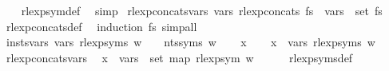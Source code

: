 \begin{isabellebody}
%
\isadelimproof
\ \ %
\endisadelimproof
%
\isatagproof
{}\isamarkupfalse%
\ rlexp{\isacharunderscore}{\kern0pt}sym{\isacharunderscore}{\kern0pt}def\ \isamarkupfalse%
\ simp%
\endisatagproof
{\isafoldproof}%
%
\isadelimproof
\isanewline
%
\endisadelimproof
\isanewline
{}\isamarkupfalse%
\ rlexp{\isacharunderscore}{\kern0pt}concats{\isacharunderscore}{\kern0pt}vars{\isacharcolon}{\kern0pt}\ {\isachardoublequoteopen}vars\ {\isacharparenleft}{\kern0pt}rlexp{\isacharunderscore}{\kern0pt}concats\ fs{\isacharparenright}{\kern0pt}\ {\isacharequal}{\kern0pt}\ {\isasymUnion}{\isacharparenleft}{\kern0pt}vars\ {\isacharbackquote}{\kern0pt}\ set\ fs{\isacharparenright}{\kern0pt}{\isachardoublequoteclose}\isanewline
%
\isadelimproof
\ \ %
\endisadelimproof
%
\isatagproof
{}\isamarkupfalse%
\ rlexp{\isacharunderscore}{\kern0pt}concats{\isacharunderscore}{\kern0pt}def\ \isamarkupfalse%
\ {\isacharparenleft}{\kern0pt}induction\ fs{\isacharparenright}{\kern0pt}\ simp{\isacharunderscore}{\kern0pt}all%
\endisatagproof
{\isafoldproof}%
%
\isadelimproof
\isanewline
%
\endisadelimproof
\isanewline
\isanewline
{}\isamarkupfalse%
\ insts{\isacharprime}{\kern0pt}{\isacharunderscore}{\kern0pt}vars{\isacharcolon}{\kern0pt}\ {\isachardoublequoteopen}vars\ {\isacharparenleft}{\kern0pt}rlexp{\isacharunderscore}{\kern0pt}syms\ w{\isacharparenright}{\kern0pt}\ {\isasymsubseteq}\ {\isasymgamma}{\isacharprime}{\kern0pt}\ {\isacharbackquote}{\kern0pt}\ nts{\isacharunderscore}{\kern0pt}syms\ w{\isachardoublequoteclose}\isanewline
%
\isadelimproof
%
\endisadelimproof
%
\isatagproof
{}\isamarkupfalse%
\isanewline
\ \ \isamarkupfalse%
\ x\isanewline
\ \ \isamarkupfalse%
\ {\isachardoublequoteopen}x\ {\isasymin}\ vars\ {\isacharparenleft}{\kern0pt}rlexp{\isacharunderscore}{\kern0pt}syms\ w{\isacharparenright}{\kern0pt}{\isachardoublequoteclose}\isanewline
\ \ \isamarkupfalse%
\ rlexp{\isacharunderscore}{\kern0pt}concats{\isacharunderscore}{\kern0pt}vars\ \isamarkupfalse%
\ {\isachardoublequoteopen}x\ {\isasymin}\ {\isasymUnion}{\isacharparenleft}{\kern0pt}vars\ {\isacharbackquote}{\kern0pt}\ set\ {\isacharparenleft}{\kern0pt}map\ rlexp{\isacharunderscore}{\kern0pt}sym\ w{\isacharparenright}{\kern0pt}{\isacharparenright}{\kern0pt}{\isachardoublequoteclose}\isanewline
\ \ \ \ \isamarkupfalse%
\ rlexp{\isacharunderscore}{\kern0pt}syms{\isacharunderscore}{\kern0pt}def\ \isamarkupfalse%

\end{isabellebody}
